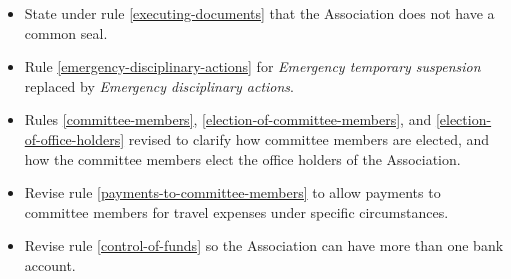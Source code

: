 \documentclass[../constitution.tex]{subfiles}
\begin{document}
\begin{itemize}
    \item State under rule \ref{executing-documents} that the Association does not have a common seal.
    \item Rule \ref{emergency-disciplinary-actions} for \textit{Emergency temporary suspension} replaced by \textit{Emergency disciplinary actions}.
    \item Rules \ref{committee-members}, \ref{election-of-committee-members}, and \ref{election-of-office-holders} revised to clarify how committee members are elected, and how the committee members elect the office holders of the Association.
    \item Revise rule \ref{payments-to-committee-members} to allow payments to committee members for travel expenses under specific circumstances.
    \item Revise rule \ref{control-of-funds} so the Association can have more than one bank account.

\end{itemize}
\end{document}
